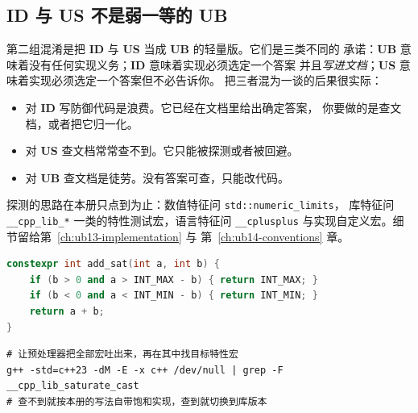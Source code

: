 \documentclass[12pt,a4paper,fontset=fandol]{ctexbook}
\newcommand{\Tp}[1]{\texttt{#1}}
\newcommand{\Bk}{\discretionary{}{}{}}
\newcommand{\UB}{\textbf{\textsf{UB}}}
\newcommand{\IDB}{\textbf{\textsf{ID}}}
\newcommand{\USB}{\textbf{\textsf{US}}}
\newcommand{\Feat}[1]{\texttt{#1}}
\begin{document}
\subsection{ID 与 US 不是弱一等的 UB}\label{sec:ub02-not-weak-ub}

第二组混淆是把 \IDB{} 与 \USB{} 当成 \UB{} 的轻量版。它们是三类不同的
承诺：\UB{} 意味着没有任何实现义务；\IDB{} 意味着实现必须选定一个答案
并且\emph{写进文档}；\USB{} 意味着实现必须选定一个答案但不必告诉你。
把三者混为一谈的后果很实际：

\begin{itemize}
  \item 对 \IDB{} 写防御代码是浪费。它已经在文档里给出确定答案，
        你要做的是查文档，或者把它归一化。
  \item 对 \USB{} 查文档常常查不到。它只能被探测或者被回避。
  \item 对 \UB{} 查文档是徒劳。没有答案可查，只能改代码。
\end{itemize}

探测的思路在本册只点到为止：数值特征问 \Tp{std::numeric{\Bk}\_limits}，
库特征问 \Feat{\_\_cpp\_lib\_*} 一类的特性测试宏，语言特征问
\Feat{\_\_cplusplus} 与实现自定义宏。细节留给第~\ref{ch:ub13-implementation} 与
第~\ref{ch:ub14-conventions} 章。

\begin{lstlisting}[style=cppstyle, language=C++, caption={可移植的饱和加：先判后算，不依赖溢出行为（上下界来自实现提供的 limits 头文件）}]
constexpr int add_sat(int a, int b) {
    if (b > 0 and a > INT_MAX - b) { return INT_MAX; }
    if (b < 0 and a < INT_MIN - b) { return INT_MIN; }
    return a + b;
}
\end{lstlisting}

\begin{lstlisting}[style=shellstyle, caption={探测实现是否已提供标准饱和算术：查特性测试宏，而不是猜版本}]
# 让预处理器把全部宏吐出来，再在其中找目标特性宏
g++ -std=c++23 -dM -E -x c++ /dev/null | grep -F __cpp_lib_saturate_cast
# 查不到就按本册的写法自带饱和实现，查到就切换到库版本
\end{lstlisting}
\end{document}

